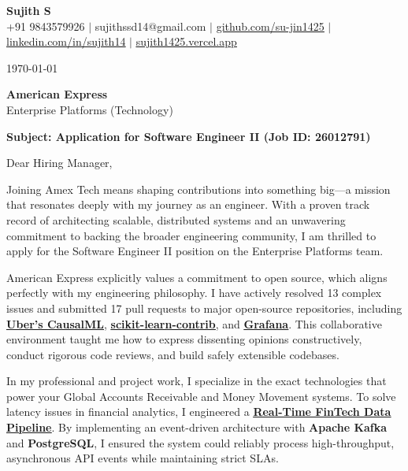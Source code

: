\documentclass[a4paper,11pt]{article}
\newcommand{\ulink}[2]{\href{#1}{\uline{#2}}}
\begin{document}
\pagestyle{empty}

\begin{center}
{\color[HTML]{000000}\fontsize{30}{35}\selectfont\bfseries Sujith S} \\[5pt]
{\fontsize{10.5}{12.5}\selectfont\textcolor[HTML]{3A3A3A}{+91 9843579926 $|$ sujithssd14@gmail.com $|$ \ulink{https://github.com/su-jin1425}{github.com/su-jin1425} $|$ \ulink{https://linkedin.com/in/sujith14}{linkedin.com/in/sujith14} $|$ \ulink{https://sujith1425.vercel.app}{sujith1425.vercel.app}}}
\end{center}

\vspace{10pt}

\today

\textbf{American Express} \\
Enterprise Platforms (Technology)

\textbf{Subject: Application for Software Engineer II (Job ID: 26012791)}

Dear Hiring Manager,

Joining Amex Tech means shaping contributions into something big---a mission that resonates deeply with my journey as an engineer. With a proven track record of architecting scalable, distributed systems and an unwavering commitment to backing the broader engineering community, I am thrilled to apply for the Software Engineer II position on the Enterprise Platforms team.

American Express explicitly values a commitment to open source, which aligns perfectly with my engineering philosophy. I have actively resolved 13 complex issues and submitted 17 pull requests to major open-source repositories, including \ulink{https://github.com/uber/causalml}{\textbf{Uber's CausalML}}, \ulink{https://github.com/scikit-learn-contrib/forest-confidence-interval}{\textbf{scikit-learn-contrib}}, and \ulink{https://github.com/grafana/alloy-scenarios}{\textbf{Grafana}}. This collaborative environment taught me how to express dissenting opinions constructively, conduct rigorous code reviews, and build safely extensible codebases.

In my professional and project work, I specialize in the exact technologies that power your Global Accounts Receivable and Money Movement systems. To solve latency issues in financial analytics, I engineered a \ulink{https://github.com/su-jin1425/Real-Time-Stock-Market-Data-Pipeline}{\textbf{Real-Time FinTech Data Pipeline}}. By implementing an event-driven architecture with \textbf{Apache Kafka} and \textbf{PostgreSQL}, I ensured the system could reliably process high-throughput, asynchronous API events while maintaining strict SLAs. 
\end{document}
